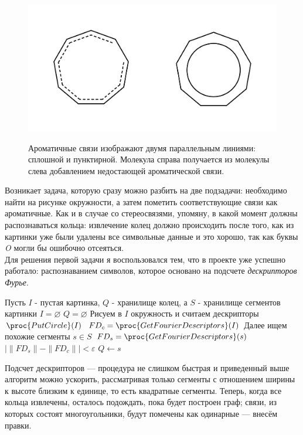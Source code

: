 \begin{figure}[h]
\centering
{\includegraphics[scale=0.4, clip, trim = 32mm 32mm 35mm 35mm]{img/rings.pdf}}
\caption{Ароматичные связи изображают двумя параллельным линиями: сплошной и пунктирной. Молекула справа получается из молекулы слева добавлением
недостающей ароматической связи.}
\end{figure}

\noindent
Возникает задача, которую сразу можно разбить на две подзадачи: необходимо найти на рисунке окружности, а затем пометить соответствующие связи
как ароматичные. Как и в случае со стереосвязями, упомяну, в какой момент должны распознаваться кольца: извлечение колец должно происходить после того, 
как из картинки уже были удалены все символьные данные и это хорошо, так как буквы \emph{O} могли бы ошибочно отсеяться. \\

\noindent
Для решения первой задачи я воспользовался тем, что в проекте уже успешно работало: распознаванием символов, которое основано на подсчете 
\emph{дескрипторов Фурье}.

\begin{codebox}
  \li \Comment Пусть $I$ - пустая картинка, $Q$ - хранилище колец, а $S$ - хранилище сегментов картинки
  \li $I = \varnothing$
  \li $Q = \varnothing$
  \li \Comment Рисуем в $I$ окружность и считаем дескрипторы
  \li $\proc{PutCircle}(I)$
  \li $ FD_{c} = \proc{GetFourierDescriptors}(I)$
  \li \Comment Далее ищем похожие сегменты
  \li \For $s \in S$
  \li \Do $FD_{s} = \proc{GetFourierDescriptors}(s)$
  \li \If $ | \parallel FD_{s} \parallel - \parallel FD_{c} \parallel |  < \varepsilon $
  \li \Then $Q \gets s$  
\end{codebox}

\noindent
Подсчет дескрипторов --- процедура не слишком быстрая и приведенный выше алгоритм можно ускорить, рассматривая только сегменты
с отношением ширины к высоте близким к единице, то есть квадратные сегменты. Теперь, когда все кольца извлечены, осталось подождать, пока
будет построен граф; связи, из которых состоят многоугольники, будут помечены как одинарные --- внесём правки.

